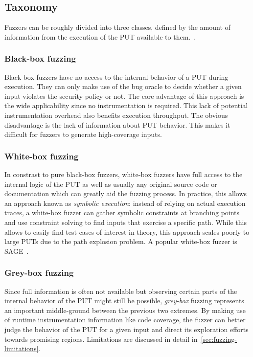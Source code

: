 
\subsection{Taxonomy\label{sec:fuzzing-taxonomy}}

Fuzzers can be roughly divided into three classes, defined by the amount of
information from the execution of the PUT available to them.~\cite{liang_fuzzing_2018}.

\subsubsection{Black-box fuzzing}

Black-box fuzzers have no access to the internal behavior of a PUT during execution.
They can only make use of the bug oracle to decide whether a given input violates
the security policy or not.
The core advantage of this approach is the wide applicability since no instrumentation
is required.
This lack of potential instrumentation overhead also benefits execution throughput.
The obvious disadvantage is the lack of information about PUT behavior.
This makes it difficult for fuzzers to generate high-coverage inputs.

\subsubsection{White-box fuzzing}

In constrast to pure black-box fuzzers, white-box fuzzers have full access to
the internal logic of the PUT as well as usually any original source code or
documentation which can greatly aid the fuzzing process.
In practice, this allows an approach known as \emph{symbolic execution}: instead
of relying on actual execution traces, a white-box fuzzer can gather symbolic
constraints at branching points and use constraint solving to find inputs that exercise
a specific path.
While this allows to easily find test cases of interest in theory, this approach scales poorly
to large PUTs due to the path explosion problem.
A popular white-box fuzzer is SAGE~\cite{TODO cite godefroid12}.

\subsubsection{Grey-box fuzzing}

Since full information is often not available but observing certain parts
of the internal behavior of the PUT might still be possible, \textit{grey-box}
fuzzing represents an important middle-ground between the previous two extremes.
By making use of runtime instrumentation information like code coverage, the fuzzer can
better judge the behavior of the PUT for a given input and direct its exploration efforts towards promising regions.
Limitations are discussed in detail in~\cref{sec:fuzzing-limitations}.

